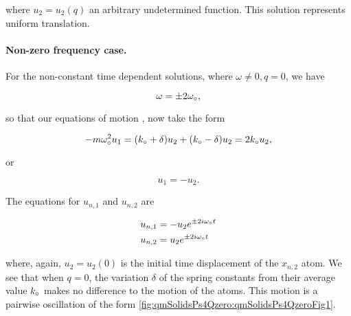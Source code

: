{where $u_2 = u_2(q)$ an arbitrary undetermined function.  This solution represents uniform translation.

%
%
%
%

\paragraph{Non-zero frequency case.}

For the non-constant time dependent solutions, where $\omega \ne 0, q = 0$, we have

\begin{dmath}\label{eqn:condensedMatterProblemSet4Problem2:560}
\omega = \pm 2 \omega_\nought,
\end{dmath}

so that our equations of motion , now take the form

\begin{dmath}\label{eqn:condensedMatterProblemSet4Problem2:640}
-m \omega_\nought^2 u_1
=
(k_\nought + \delta)
u_2
+ (k_\nought - \delta)
u_2
=
2 k_\nought
u_2,
\end{dmath}

or

\begin{dmath}\label{eqn:condensedMatterProblemSet4Problem2:660}
u_1 = -u_2.
\end{dmath}

The equations for $u_{n, 1}$ and $u_{n, 2}$ are

\begin{dmath}\label{eqn:condensedMatterProblemSet4Problem2:600}
\begin{aligned}
u_{n, 1} &= -u_2 e^{ \pm 2 i \omega_\nought t } \\
u_{n, 2} &= u_2 e^{ \pm 2 i \omega_\nought t }
\end{aligned}
\end{dmath}

where, again, $u_2 = u_2(0)$ is the initial time displacement of the $x_{n, 2}$ atom.  We see that when $q = 0$, the variation $\delta$ of the spring constants from their average value $k_\circ$ makes no difference to the motion of the atoms.  This motion is a pairwise oscillation of the form \cref{fig:qmSolidsPs4Qzero:qmSolidsPs4QzeroFig1}.

}
